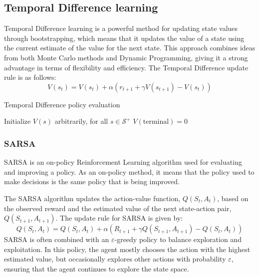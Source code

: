 \subsection{Temporal Difference learning}
Temporal Difference learning is a powerful method for updating state values through bootstrapping, which means that it updates the value of a state using the current estimate of the value for the next state. 
This approach combines ideas from both Monte Carlo methods and Dynamic Programming, giving it a strong advantage in terms of flexibility and efficiency.
The Temporal Difference update rule is as follows:
\[V(s_t) = V(s_t)+\alpha(r_{t+1}+\gamma V(s_{t+1})-V(s_t))\]
\begin{algorithm}[H]
    \caption{Temporal Difference policy evaluation}
        \begin{algorithmic}[1]
            \State Initialize $V(s)$ arbitrarily, for all $s\in\mathcal{S}^{+}$
            \State $V(\text{terminal})=0$
            \EndFor
        \end{algorithmic}
\end{algorithm}
    
\subsubsection{SARSA}
SARSA is an on-policy Reinforcement Learning algorithm used for evaluating and improving a policy. 
As an on-policy method, it means that the policy used to make decisions is the same policy that is being improved.

The SARSA algorithm updates the action-value function, $Q(S_t,A_t)$, based on the observed reward and the estimated value of the next state-action pair, $Q(S_{t+1},A_{t+1})$. 
The update rule for SARSA is given by:
\[Q(S_t,A_t)=Q(S_t,A_t)+\alpha(R_{t+1}+\gamma Q(S_{t+1},A_{t+1})-Q(S_t,A_t))\]
SARSA is often combined with an $\varepsilon$-greedy policy to balance exploration and exploitation. 
In this policy, the agent mostly chooses the action with the highest estimated value, but occasionally explores other actions with probability $\varepsilon$, ensuring that the agent continues to explore the state space.

